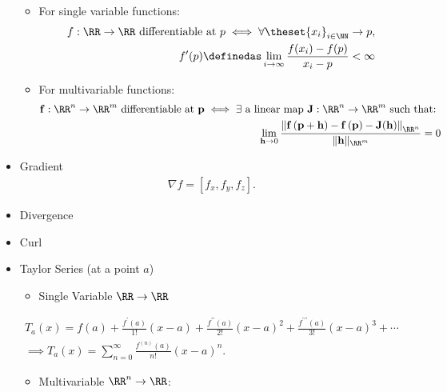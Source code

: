 \begin{itemize}
  \begin{itemize}
  \item
    For single variable functions:
    \begin{align*}
    f:\RR \to \RR ~\text{differentiable at } p \iff
    \forall \theset{x_i}_{i\in \NN}\to p,\\
    f'(p) \definedas \lim_{i\to\infty} \frac{f(x_i) - f(p)}{x_i - p}< \infty
    \end{align*}
  \item
    For multivariable functions:
    \begin{align*}
    \mathbf{f}:\RR^n \to \RR^m ~\text{differentiable at } \mathbf{p} \iff \exists \text{ a linear map } \mathbf{J}:\RR^n \to \RR^m \text{ such that: } \\ \lim _ { \mathbf{h} \rightarrow 0 } \frac { \left\| \mathbf { f } \left( \mathbf{p} + \mathbf { h } \right) - \mathbf { f } \left( \mathbf { p } \right) - \mathbf { J } ( \mathbf { h } ) \right\|_ {\RR^n}} { \| \mathbf { h } \|_ {\RR^m} } = 0
    \end{align*}
  \end{itemize}
\item
  Gradient
  \begin{align*}  
  \nabla f = [f_x, f_y, f_z]
  .\end{align*}
\item
  Divergence
\item
  Curl
\item
  Taylor Series (at a point \(a\))

  \begin{itemize}
  \tightlist
  \item
    Single Variable \(\RR \to \RR\)
  \end{itemize}

  \begin{align*}  
    T_a(x) = f ( a ) + \frac { f ^ { \prime } ( a ) } { 1 ! } ( x - a ) + \frac { f ^ { \prime \prime } ( a ) } { 2 ! } ( x - a ) ^ { 2 } + \frac { f ^ { \prime \prime \prime } ( a ) } { 3 ! } ( x - a ) ^ { 3 } + \cdots \\ \implies T_a(x) = \sum _ { n = 0 } ^ { \infty } \frac { f ^ { ( n ) } ( a ) } { n ! } ( x - a ) ^ { n }
  .\end{align*}

  \begin{itemize}
  \tightlist
  \item
    Multivariable \(\RR^n \to \RR\):
  \end{itemize}


\end{itemize}
